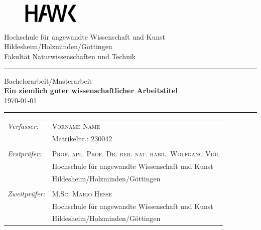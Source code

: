 

\begin{titlepage}

    \begin{figure}
        \includegraphics[width=0.25\textwidth]{pic/hawk-logo}%
    \end{figure}
	\vspace{1em}
     Hochschule für angewandte Wissenschaft und Kunst \\
	Hildesheim/Holzminden/Göttingen \\
	Fakultät Naturwissenschaften und Technik \\[0.5em]
	\setcounter{figure}{0}		%
	\hrule

	\vspace{3.0cm}
	\begin{center}
		{\large Bachelorarbeit/Masterarbeit} \\[0.8cm]
		{\Large \textbf{Ein ziemlich guter wissenschaftlicher Arbeitstitel}}\\[0.8cm]
		{\large \today}\\[2.5cm]
	\end{center}
	\vspace*{\fill} %
	
	
	\hrule
	\vspace{0.5em}
	\begin{tabular}{ p{} p{}}
	\textit{Verfasser:} 	& \textsc{Vorname Name} \\
							& Matrikelnr.: 230042 \\
	                        & \\
	\textit{Erstprüfer:}    & \textsc{Prof. apl. Prof. Dr. rer. nat. habil. Wolfgang Viöl} \\
							& Hochschule für angewandte Wissenschaft und Kunst \\
							& Hildesheim/Holzminden/Göttingen \\
							& \\
	\textit{Zweitprüfer:}   & \textsc{M.Sc. Mario Hesse} \\
							& Hochschule für angewandte Wissenschaft und Kunst \\
							& Hildesheim/Holzminden/Göttingen \\



\end{tabular}
\end{titlepage}
